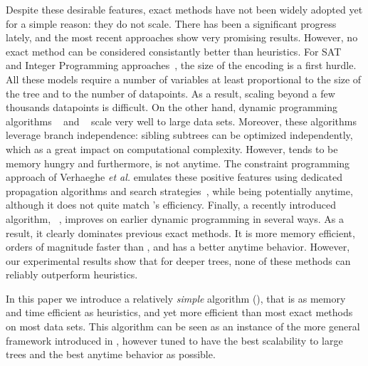 \documentclass{llncs}
\begin{document}

Despite these desirable features, exact methods have not been widely adopted yet for a simple reason: they do not scale. There has been a significant progress lately, and the most recent approaches show very promising results. However, no exact method can be considered consistantly better than heuristics. 
For SAT~\cite{avellanedaefficient,narodytska2018learning} and Integer Programming approaches~\cite{aghaei2020learning,bertsimas2017optimal,bertsimas2007classification,verwer2019learning}, the size of the encoding is a first hurdle. All these models require a number of variables at least proportional to the size of the tree and to the number of datapoints. As a result, scaling beyond a few thousands datapoints is difficult. 
On the other hand, dynamic programming algorithms \olddleight~\cite{dl8} and \dleight~\cite{dl85} scale very well to large data sets. Moreover, these algorithms leverage branch independence: sibling subtrees can be optimized independently, which as a great impact on computational complexity. However, \dleight tends to be memory hungry and furthermore, is not anytime.
The constraint programming approach of Verhaeghe \textit{et al.} emulates these positive features using dedicated propagation algorithms and search strategies~\cite{verhaeghe2019learning}, while being potentially anytime, although it does not quite match \dleight's efficiency.
Finally, a recently introduced algorithm, \murtree~\cite{DBLP:journals/corr/abs-2007-12652}, improves on earlier dynamic programming in several ways. As a result, it clearly dominates previous exact methods. It is more memory efficient, orders of magnitude faster than \dleight, and has a better anytime behavior. However, our experimental results show that for deeper trees, none of these methods can reliably outperform heuristics.
 

\medskip

In this paper we introduce a relatively \emph{simple} algorithm (\budalg), that is as memory and time efficient as heuristics, and yet more efficient than most exact methods on most data sets. 
This algorithm can be seen as an instance of the more general framework introduced in \cite{DBLP:journals/corr/abs-2007-12652}, however tuned to have the best scalability to large trees and the best anytime behavior as possible. 
\end{document}
